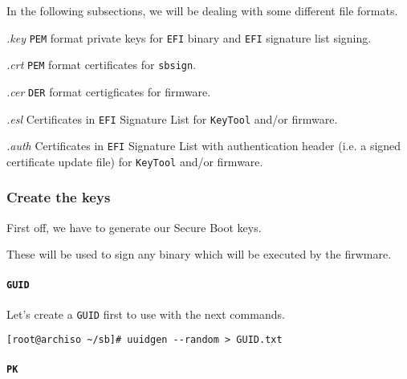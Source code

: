 \documentclass[10pt]{dustdoc}
\begin{document}
In the following subsections, we will be dealing with some different file formats.

\begin{sidebar}{\textit{.key}}
    \texttt{PEM} format private keys for \texttt{EFI} binary and \texttt{EFI} signature list signing.
\end{sidebar}

\begin{sidebar}{\textit{.crt}}
    \texttt{PEM} format certificates for \texttt{sbsign}.
\end{sidebar}

\begin{sidebar}{\textit{.cer}}
    \texttt{DER} format certigficates for firmware.
\end{sidebar}

\begin{sidebar}{\textit{.esl}}
    Certificates in \texttt{EFI} Signature List for \texttt{KeyTool} and/or firmware.
\end{sidebar}

\begin{sidebar}{\textit{.auth}}
    Certificates in \texttt{EFI} Signature List with authentication header (i.e. a signed certificate update file) for \texttt{KeyTool} and/or firmware.
\end{sidebar}

\subsubsection{Create the keys}
\label{sec:create-the-keys}

First off, we have to generate our Secure Boot keys.

These will be used to sign any binary which will be executed by the firwmare.

\paragraph{\texttt{GUID}}
\label{par:guid}

Let’s create a \texttt{GUID} first to use with the next commands.

\begin{verbatim}
[root@archiso ~/sb]# uuidgen --random > GUID.txt
\end{verbatim}

\paragraph{\texttt{PK}}
\label{par:pk}
\end{document}
